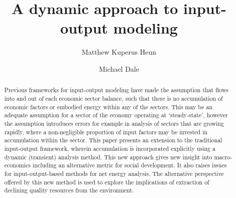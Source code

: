 \documentclass[authoryear,preprint,review,12pt]{elsarticle}
\begin{document}
\begin{frontmatter}



\title{A dynamic approach to input-output modeling}


\author[Calvin]{Matthew Kuperus Heun}
\author[Stanford]{Michael Dale }



\address[Calvin]{Engineering Department, Calvin College, Grand Rapids, MI 49503, USA}
\address[Stanford]{Department of Energy Resources Engineering, Stanford University, Stanford, CA 94305, USA}


\begin{abstract}

Previous frameworks for input-output modeling have made the assumption that flows into and out of each economic sector balance, such that there is no accumulation of economic factors or embodied energy within any of the sectors. This may be an adequate assumption for a sector of the economy operating at `steady-state', however the assumption introduces errors for example in analysis of sectors that are growing rapidly, where a non-negligible proportion of input factors may be invested in accumulation within the sector. This paper presents an extension to the traditional input-output framework, wherein accumulation is incorporated explicitly using a dynamic (transient) analysis method. This new approach gives new insight into macro-economics including an alternative metric for social development. It also raises issues for input-output-based methods for net energy analysis. The alternative perspective offered by this new method is used to explore the implications of extraction of declining quality resources from the environment.


\end{abstract}
\end{frontmatter}
\end{document}
